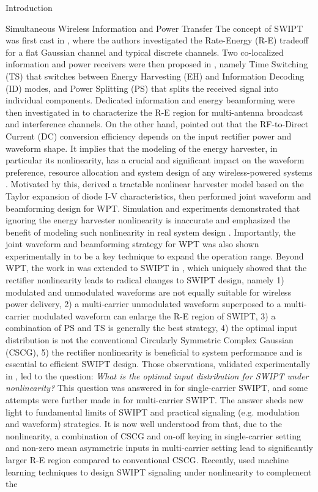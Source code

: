 \documentclass[journal]{IEEEtran}
\begin{document}
\begin{section}{Introduction}
\begin{subsection}{Simultaneous Wireless Information and Power Transfer}
			The concept of SWIPT was first cast in \cite{Varshney2008}, where the authors investigated the Rate-Energy (R-E) tradeoff for a flat Gaussian channel and typical discrete channels. Two co-localized information and power receivers were then proposed in \cite{Zhou2013}, namely Time Switching (TS) that switches between Energy Harvesting (EH) and Information Decoding (ID) modes, and Power Splitting (PS) that splits the received signal into individual components. Dedicated information and energy beamforming were then investigated in \cite{Zhang2013,Park2013} to characterize the R-E region for multi-antenna broadcast and interference channels. On the other hand, \cite{Trotter2009} pointed out that the RF-to-Direct Current (DC) conversion efficiency depends on the input rectifier power and waveform shape. It implies that the modeling of the energy harvester, in particular its nonlinearity, has a crucial and significant impact on the waveform preference, resource allocation and system design of any wireless-powered systems \cite{Trotter2009,Clerckx2018,Clerckx2019}. Motivated by this, \cite{Clerckx2016a} derived a tractable nonlinear harvester model based on the Taylor expansion of diode I-V characteristics, then performed joint waveform and beamforming design for WPT. Simulation and experiments demonstrated that ignoring the energy harvester nonlinearity is inaccurate and emphasized the benefit of modeling such nonlinearity in real system design \cite{Kim2019,Kim2020a}. Importantly, the joint waveform and beamforming strategy for WPT was also shown experimentally in \cite{Kim2020} to be a key technique to expand the operation range. Beyond WPT, the work in \cite{Clerckx2016a} was extended to SWIPT in \cite{Clerckx2018b}, which uniquely showed that the rectifier nonlinearity leads to radical changes to SWIPT design, namely 1) modulated and unmodulated waveforms are not equally suitable for wireless power delivery, 2) a multi-carrier unmodulated waveform superposed to a multi-carrier modulated waveform can enlarge the R-E region of SWIPT, 3) a combination of PS and TS is generally the best strategy, 4) the optimal input distribution is not the conventional Circularly Symmetric Complex Gaussian (CSCG), 5) the rectifier nonlinearity is beneficial to system performance and is essential to efficient SWIPT design. Those observations, validated experimentally in \cite{Kim2019}, led to the question: \textit{What is the optimal input distribution for SWIPT under nonlinearity?} This question was answered in \cite{Varasteh2020} for single-carrier SWIPT, and some attempts were further made in \cite{Varasteh2019d} for multi-carrier SWIPT. The answer sheds new light to fundamental limits of SWIPT and practical signaling (e.g. modulation and waveform) strategies. It is now well understood from \cite{Clerckx2018b,Varasteh2020,Varasteh2019d} that, due to the nonlinearity, a combination of CSCG and on-off keying in single-carrier setting and non-zero mean asymmetric inputs in multi-carrier setting lead to significantly larger R-E region compared to conventional CSCG. Recently, \cite{Varasteh2020a} used machine learning techniques to design SWIPT signaling under nonlinearity to complement the 
\end{subsection}
\end{section}
\end{document}
